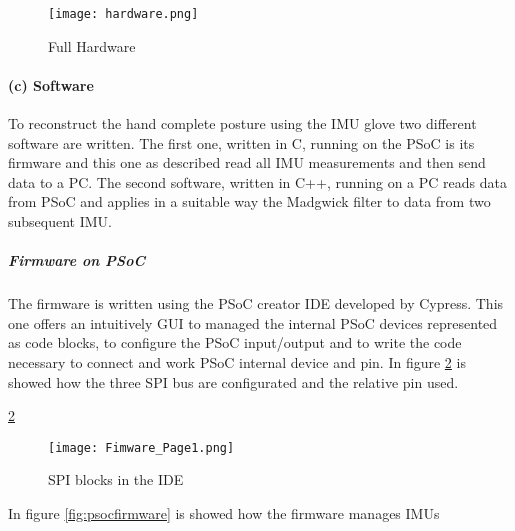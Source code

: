 \begin{figure}[h]
\centering
\texttt{[image: hardware.png]}
\caption{Full Hardware}
\label{fig:hardware}
\end{figure}


\paragraph{(c) Software}

To reconstruct the hand complete posture using the IMU glove two different software are written. The first one, written in C, running on the PSoC is its firmware and this one as described read all IMU measurements and then send data to a PC.
The second software, written in C++, running on a PC reads data from PSoC and applies in a suitable way the Madgwick filter to data from two subsequent IMU.

\subparagraph{Firmware on PSoC}

The firmware is written using the PSoC creator IDE developed by Cypress. This one offers an intuitively GUI to
managed the internal PSoC devices represented as code blocks, to configure the PSoC input/output and to write the code necessary to connect and work PSoC internal device and pin.%
In figure \ref{fig:firmwarepage1} is showed how the three SPI bus are configurated and the relative pin used.%

\ref{fig:firmwarepage1}
\begin{figure}[h]
\centering
\texttt{[image: Fimware\_Page1.png]}
\caption{SPI blocks in the IDE}
\label{fig:firmwarepage1}
\end{figure}  

In figure \ref{fig:psocfirmware} is showed how the firmware manages IMUs %

